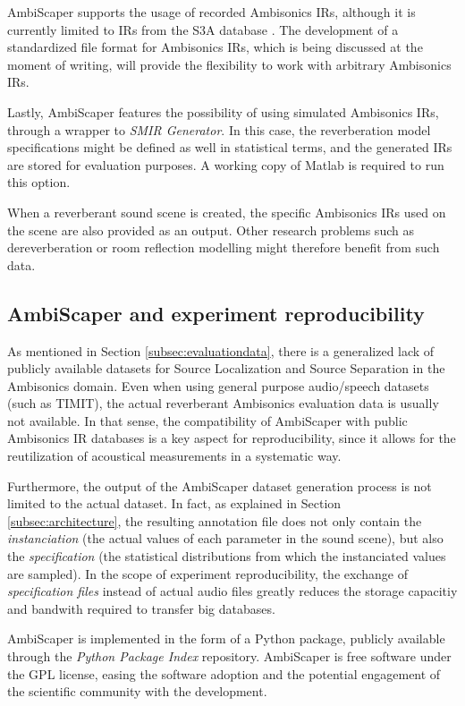 AmbiScaper supports the usage of recorded Ambisonics IRs, although it is currently limited to IRs from the S3A database \cite{coleman2015s3a}. The development of a standardized file format for Ambisonics IRs, which is being discussed at the moment of writing, will provide the flexibility to work with arbitrary Ambisonics IRs.   

Lastly, AmbiScaper features the possibility of using simulated Ambisonics IRs, through a wrapper to \textit{SMIR Generator}. In this case, the reverberation model specifications might be defined as well in statistical terms, and the generated IRs are stored for evaluation purposes. A working copy of Matlab is required to run this option.

When a reverberant sound scene is created, the specific Ambisonics IRs used on the scene are also provided as an output. Other research problems such as dereverberation or room reflection modelling might therefore benefit from such data.




\subsection{AmbiScaper and experiment reproducibility}

As mentioned in Section \ref{subsec:evaluationdata}, there is a generalized lack of publicly available datasets for Source Localization and Source Separation in the Ambisonics domain. Even when using general purpose audio/speech datasets (such as TIMIT), the actual reverberant Ambisonics evaluation data is usually not available.
In that sense, the compatibility of AmbiScaper with public Ambisonics IR databases is a key aspect for reproducibility, since it allows for the reutilization of acoustical measurements in a systematic way.

Furthermore, the output of the AmbiScaper dataset generation process is not limited to the actual dataset. In fact, as explained in Section \ref{subsec:architecture}, the resulting annotation file does not only contain the \textit{instanciation} (the actual values of each parameter in the sound scene), but also the \textit{specification} (the statistical distributions from which the instanciated values are sampled). In the scope of experiment reproducibility, the exchange of \textit{specification files} instead of actual audio files greatly reduces the storage capacitiy and bandwith required to transfer big databases. 

AmbiScaper is implemented in the form of a Python package, publicly available through the \textit{Python Package Index} repository. 
AmbiScaper is free software under the GPL license, easing the software adoption and the potential engagement of the scientific community with the development. 


